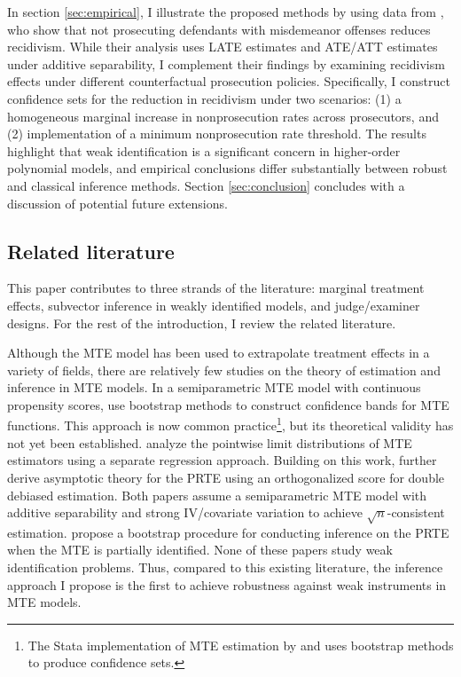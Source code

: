 \documentclass[11pt]{article}
\theoremstyle{definition}
\newcommand{\0}{\ensuremath{\mathbf{0}}}
\begin{document}
\begin{bibunit}
In section \ref{sec:empirical}, I illustrate the proposed methods by using data from \cite{agan/doleac/harvey:2023}, who show that not prosecuting defendants with misdemeanor offenses reduces recidivism. While their analysis uses LATE estimates and ATE/ATT estimates under additive separability, I complement their findings by examining recidivism effects under different counterfactual prosecution policies. Specifically, I construct confidence sets for the reduction in recidivism under two scenarios: (1) a homogeneous marginal increase in nonprosecution rates across prosecutors, and (2) implementation of a minimum nonprosecution rate threshold. The results highlight that weak identification is a significant concern in higher-order polynomial models, and empirical conclusions differ substantially between robust and classical inference methods. Section \ref{sec:conclusion} concludes with a discussion of potential future extensions.

\subsection*{Related literature}

This paper contributes to three strands of the literature: marginal treatment effects, subvector inference in weakly identified models, and judge/examiner designs. For the rest of the introduction, I review the related literature. 

Although the MTE model has been used to extrapolate treatment effects in a variety of fields, there are relatively few studies on the theory of estimation and inference in MTE models. In a semiparametric MTE model with continuous propensity scores, \cite{heckman/urzua/vytlacil:2006a} use bootstrap methods to construct confidence bands for MTE functions. This approach is now common practice\footnote{The Stata implementation of MTE estimation by \cite{brave/walstrum:2014} and \cite{andresen:2018} uses bootstrap methods to produce confidence sets.}, but its theoretical validity has not yet been established. \cite{carneiro/lee:2009} analyze the pointwise limit distributions of MTE estimators using a separate regression approach. Building on this work, \cite{sasaki/ura:2023} further derive asymptotic theory for the PRTE using an orthogonalized score for double debiased estimation. Both papers assume a semiparametric MTE model with additive separability and strong IV/covariate variation to achieve $\sqrt{n}$-consistent estimation.  \cite{mogstad/santos/torgovitsky:2017, mogstad/santos/torgovitsky:2018} propose a bootstrap procedure for conducting inference on the PRTE when the MTE is partially identified. None of these papers study weak identification problems. Thus, compared to this existing literature, the inference approach I propose is the first to achieve robustness against weak instruments in MTE models.


\end{bibunit}
\end{document}
